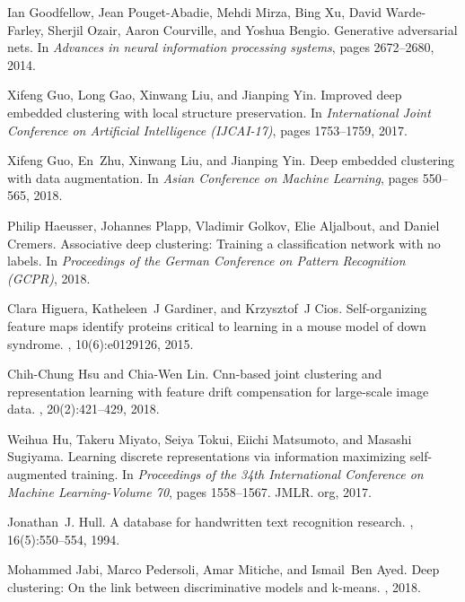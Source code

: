 \documentclass{article}
\begin{document}
\begin{thebibliography}{10}
Ian Goodfellow, Jean Pouget-Abadie, Mehdi Mirza, Bing Xu, David Warde-Farley,
  Sherjil Ozair, Aaron Courville, and Yoshua Bengio.
\newblock Generative adversarial nets.
\newblock In {\em Advances in neural information processing systems}, pages
  2672--2680, 2014.

Xifeng Guo, Long Gao, Xinwang Liu, and Jianping Yin.
\newblock Improved deep embedded clustering with local structure preservation.
\newblock In {\em International Joint Conference on Artificial Intelligence
  (IJCAI-17)}, pages 1753--1759, 2017.

Xifeng Guo, En~Zhu, Xinwang Liu, and Jianping Yin.
\newblock Deep embedded clustering with data augmentation.
\newblock In {\em Asian Conference on Machine Learning}, pages 550--565, 2018.

Philip Haeusser, Johannes Plapp, Vladimir Golkov, Elie Aljalbout, and Daniel
  Cremers.
\newblock Associative deep clustering: Training a classification network with
  no labels.
\newblock In {\em Proceedings of the German Conference on Pattern Recognition
  (GCPR)}, 2018.

Clara Higuera, Katheleen~J Gardiner, and Krzysztof~J Cios.
\newblock Self-organizing feature maps identify proteins critical to learning
  in a mouse model of down syndrome.
, 10(6):e0129126, 2015.

Chih-Chung Hsu and Chia-Wen Lin.
\newblock Cnn-based joint clustering and representation learning with feature
  drift compensation for large-scale image data.
, 20(2):421--429, 2018.

Weihua Hu, Takeru Miyato, Seiya Tokui, Eiichi Matsumoto, and Masashi Sugiyama.
\newblock Learning discrete representations via information maximizing
  self-augmented training.
\newblock In {\em Proceedings of the 34th International Conference on Machine
  Learning-Volume 70}, pages 1558--1567. JMLR. org, 2017.

Jonathan~J. Hull.
\newblock A database for handwritten text recognition research.
,
  16(5):550--554, 1994.

Mohammed Jabi, Marco Pedersoli, Amar Mitiche, and Ismail~Ben Ayed.
\newblock Deep clustering: On the link between discriminative models and
  k-means.
, 2018.


\end{thebibliography}
\end{document}
